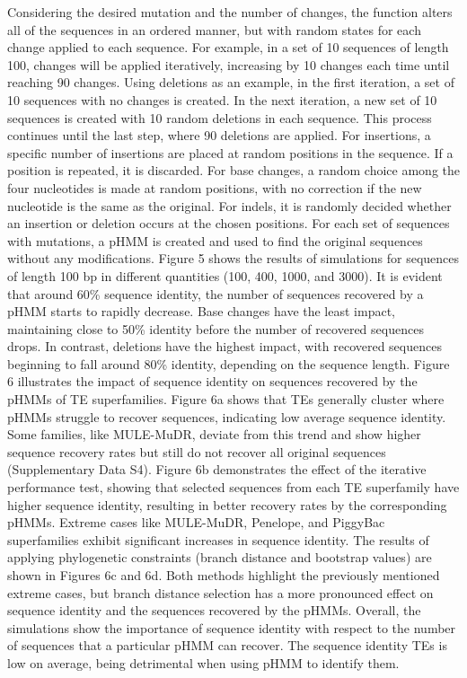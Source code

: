 \documentclass[unnumsec,webpdf,contemporary,large]{oup-authoring-template}%
\theoremstyle{thmstyleone}%
\theoremstyle{thmstyletwo}%
\theoremstyle{thmstylethree}%
\begin{document}
Considering the desired mutation and the number of changes, the function alters all of the sequences in an ordered manner, but with random states for each change applied to each sequence. For example, in a set of 10 sequences of length 100, changes will be applied iteratively, increasing by 10 changes each time until reaching 90 changes. Using deletions as an example, in the first iteration, a set of 10 sequences with no changes is created. In the next iteration, a new set of 10 sequences is created with 10 random deletions in each sequence. This process continues until the last step, where 90 deletions are applied. For insertions, a specific number of insertions are placed at random positions in the sequence. If a position is repeated, it is discarded. For base changes, a random choice among the four nucleotides is made at random positions, with no correction if the new nucleotide is the same as the original. For indels, it is randomly decided whether an insertion or deletion occurs at the chosen positions.
For each set of sequences with mutations, a pHMM is created and used to find the original sequences without any modifications. Figure 5 shows the results of simulations for sequences of length 100 bp in different quantities (100, 400, 1000, and 3000). It is evident that around 60\% sequence identity, the number of sequences recovered by a pHMM starts to rapidly decrease. Base changes have the least impact, maintaining close to 50\% identity before the number of recovered sequences drops. In contrast, deletions have the highest impact, with recovered sequences beginning to fall around 80\% identity, depending on the sequence length.
Figure 6 illustrates the impact of sequence identity on sequences recovered by the pHMMs of TE superfamilies. Figure 6a shows that TEs generally cluster where pHMMs struggle to recover sequences, indicating low average sequence identity. Some families, like MULE-MuDR, deviate from this trend and show higher sequence recovery rates but still do not recover all original sequences (Supplementary Data S4). Figure 6b demonstrates the effect of the iterative performance test, showing that selected sequences from each TE superfamily have higher sequence identity, resulting in better recovery rates by the corresponding pHMMs. Extreme cases like MULE-MuDR, Penelope, and PiggyBac superfamilies exhibit significant increases in sequence identity. The results of applying phylogenetic constraints (branch distance and bootstrap values) are shown in Figures 6c and 6d. Both methods highlight the previously mentioned extreme cases, but branch distance selection has a more pronounced effect on sequence identity and the sequences recovered by the pHMMs.
Overall, the simulations show the importance of sequence identity with respect to the number of sequences that a particular pHMM can recover. The sequence identity TEs is low on average, being detrimental when using pHMM to identify them.
\end{document}
